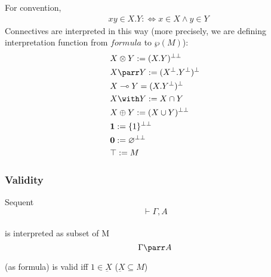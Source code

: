\documentclass[dvipdfmx,cjk]{beamer}
\theoremstyle{example}
\begin{document}
\begin{frame}
  \begin{definition}
    For convention,
    \begin{align*}
      & xy \in X.Y :\Leftrightarrow x \in X \land y \in Y 
    \end{align*}
    Connectives are interpreted in this way (more precisely, we are defining interpretation function from $formula$ to $\wp{(M)}$):
    \begin{align*}
     & X \otimes Y := (X.Y)^{\bot\bot} \\
     & X \parr   Y := (X^\bot.Y^\bot)^\bot \\
     & X \multimap Y = (X.Y^\bot)^\bot \\
     & X \with Y := X \cap Y \\
     & X \oplus Y := (X \cup Y)^{\bot\bot} \\
     & \textbf{1} := \{1\}^{\bot\bot} \\
     & \textbf{0} := \varnothing^{\bot\bot} \\
     & \top := M
    \end{align*}
  \end{definition}
\end{frame}

\begin{frame}
  \frametitle{Validity}
  \begin{definition}
    Sequent \\
    \[ \vdash \Gamma, A\] \\
    is interpreted as subset of M \\
    \[ \Gamma \parr A \]
  \end{definition}
  
  \begin{definition}{ (as formula) is valid} iff
    $ 1 \in \underbar{X} $
    ($ \underbar{X} \subseteq M $)
  \end{definition}
\end{frame}
\end{document}
